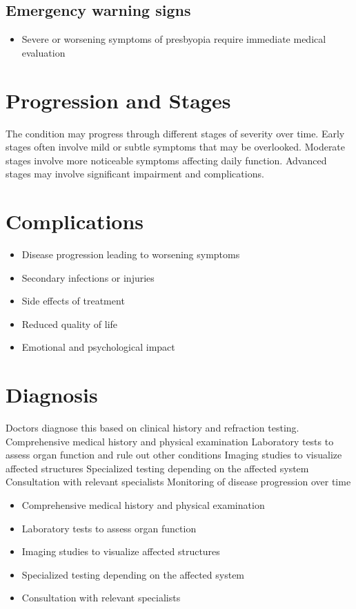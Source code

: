 \subsection{Emergency warning signs}
\begin{itemize}[noitemsep]
  \item Severe or worsening symptoms of presbyopia require immediate medical evaluation
\end{itemize}
\section{Progression and Stages}
The condition may progress through different stages of severity over time. Early stages often involve mild or subtle symptoms that may be overlooked. Moderate stages involve more noticeable symptoms affecting daily function. Advanced stages may involve significant impairment and complications.
\section{Complications}
\begin{itemize}[noitemsep]
  \item Disease progression leading to worsening symptoms
  \item Secondary infections or injuries
  \item Side effects of treatment
  \item Reduced quality of life
  \item Emotional and psychological impact
\end{itemize}
\section{Diagnosis}
Doctors diagnose this based on clinical history and refraction testing. Comprehensive medical history and physical examination Laboratory tests to assess organ function and rule out other conditions Imaging studies to visualize affected structures Specialized testing depending on the affected system Consultation with relevant specialists Monitoring of disease progression over time

\begin{itemize}[noitemsep]
  \item Comprehensive medical history and physical examination
  \item Laboratory tests to assess organ function
  \item Imaging studies to visualize affected structures
  \item Specialized testing depending on the affected system
  \item Consultation with relevant specialists
\end{itemize}
